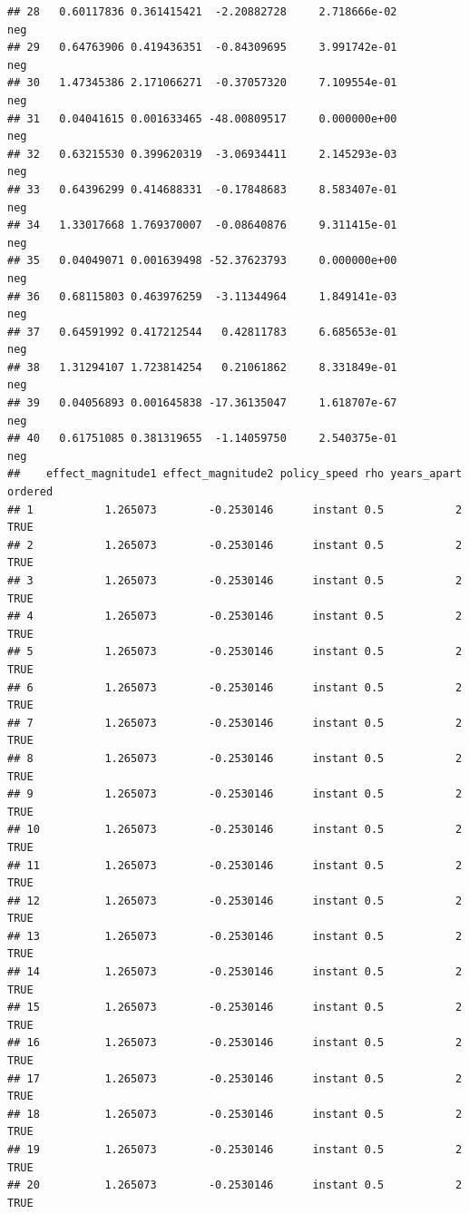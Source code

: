 \documentclass[
]{article}
\begin{document}
\begin{verbatim}
## 28   0.60117836 0.361415421  -2.20882728     2.718666e-02              neg
## 29   0.64763906 0.419436351  -0.84309695     3.991742e-01              neg
## 30   1.47345386 2.171066271  -0.37057320     7.109554e-01              neg
## 31   0.04041615 0.001633465 -48.00809517     0.000000e+00              neg
## 32   0.63215530 0.399620319  -3.06934411     2.145293e-03              neg
## 33   0.64396299 0.414688331  -0.17848683     8.583407e-01              neg
## 34   1.33017668 1.769370007  -0.08640876     9.311415e-01              neg
## 35   0.04049071 0.001639498 -52.37623793     0.000000e+00              neg
## 36   0.68115803 0.463976259  -3.11344964     1.849141e-03              neg
## 37   0.64591992 0.417212544   0.42811783     6.685653e-01              neg
## 38   1.31294107 1.723814254   0.21061862     8.331849e-01              neg
## 39   0.04056893 0.001645838 -17.36135047     1.618707e-67              neg
## 40   0.61751085 0.381319655  -1.14059750     2.540375e-01              neg
##    effect_magnitude1 effect_magnitude2 policy_speed rho years_apart ordered
## 1           1.265073        -0.2530146      instant 0.5           2    TRUE
## 2           1.265073        -0.2530146      instant 0.5           2    TRUE
## 3           1.265073        -0.2530146      instant 0.5           2    TRUE
## 4           1.265073        -0.2530146      instant 0.5           2    TRUE
## 5           1.265073        -0.2530146      instant 0.5           2    TRUE
## 6           1.265073        -0.2530146      instant 0.5           2    TRUE
## 7           1.265073        -0.2530146      instant 0.5           2    TRUE
## 8           1.265073        -0.2530146      instant 0.5           2    TRUE
## 9           1.265073        -0.2530146      instant 0.5           2    TRUE
## 10          1.265073        -0.2530146      instant 0.5           2    TRUE
## 11          1.265073        -0.2530146      instant 0.5           2    TRUE
## 12          1.265073        -0.2530146      instant 0.5           2    TRUE
## 13          1.265073        -0.2530146      instant 0.5           2    TRUE
## 14          1.265073        -0.2530146      instant 0.5           2    TRUE
## 15          1.265073        -0.2530146      instant 0.5           2    TRUE
## 16          1.265073        -0.2530146      instant 0.5           2    TRUE
## 17          1.265073        -0.2530146      instant 0.5           2    TRUE
## 18          1.265073        -0.2530146      instant 0.5           2    TRUE
## 19          1.265073        -0.2530146      instant 0.5           2    TRUE
## 20          1.265073        -0.2530146      instant 0.5           2    TRUE

\end{verbatim}
\end{document}
